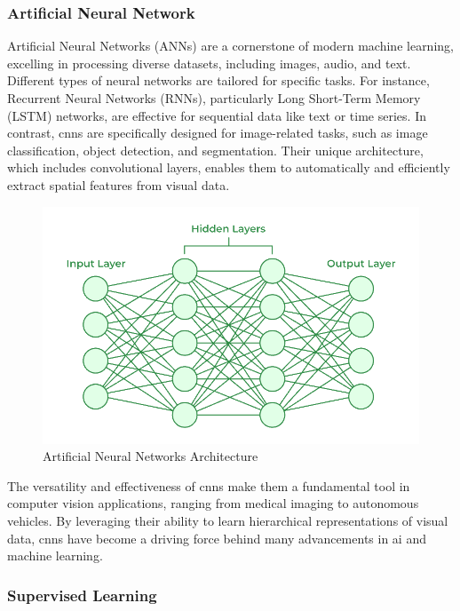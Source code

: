 \subsubsection*{Artificial Neural Network}

Artificial Neural Networks (ANNs) are a cornerstone of modern machine learning, excelling in processing diverse datasets, including images, audio, and text. Different types of neural networks are tailored for specific tasks. For instance, Recurrent Neural Networks (RNNs), particularly Long Short-Term Memory (LSTM) networks, are effective for sequential data like text or time series. In contrast, \glspl{cnn} are specifically designed for image-related tasks, such as image classification, object detection, and segmentation. Their unique architecture, which includes convolutional layers, enables them to automatically and efficiently extract spatial features from visual data. \cite{geeksforgeeks:cnn} \\

\begin{figure}[h!]
    \centering
    \includegraphics[width=0.75\linewidth]{figures//theory/artificial-neural-network.png}
    \caption{Artificial Neural Networks Architecture \cite{geeksforgeeks:ann}}
    \label{fig:artificial-neural-network}
\end{figure}

The versatility and effectiveness of \glspl{cnn} make them a fundamental tool in computer vision applications, ranging from medical imaging to autonomous vehicles. By leveraging their ability to learn hierarchical representations of visual data, \glspl{cnn} have become a driving force behind many advancements in \gls{ai} and machine learning.


\subsubsection*{Supervised Learning}

